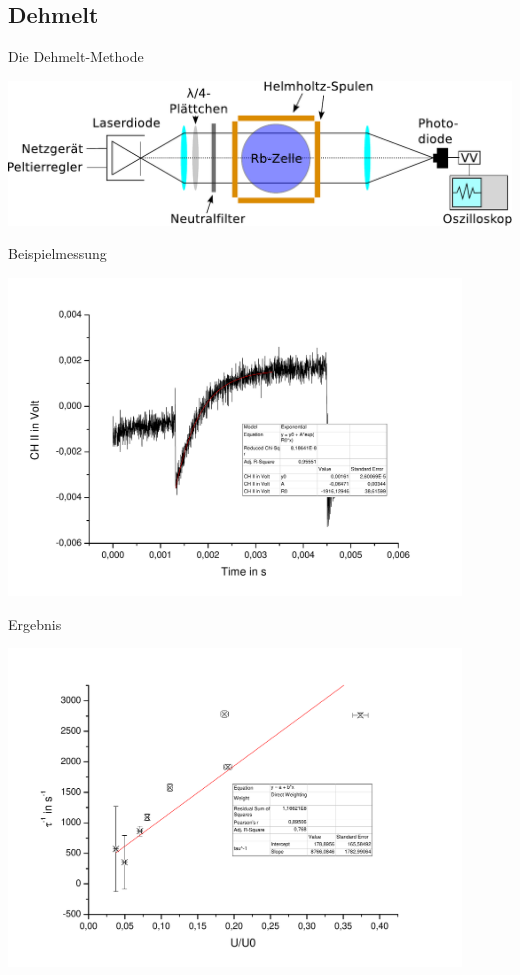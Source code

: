 \documentclass{beamer}
\begin{document}
\subsection{Dehmelt}
\begin{frame}{Die Dehmelt-Methode}
\begin{center}
\centering \includegraphics[width=\textwidth]{Bilder/ABDehmelt.pdf}
\end{center}
\end{frame}

\begin{frame}{Beispielmessung}
\begin{center}
\centering \includegraphics[width=0.9\textwidth]{Bilder/DehmeltBsp.pdf}
\end{center}
\end{frame}

\begin{frame}{Ergebnis}
\begin{center}
\centering \includegraphics[width=0.9\textwidth]{Bilder/Dehmelt.pdf}
\end{center}
\end{frame}
\end{document}

